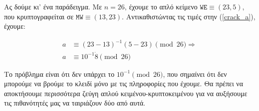 \documentclass{article}
\begin{document}
Ας δούμε κι' ένα παράδειγμα. Με $n = 26$, έχουμε το απλό κείμενο $\texttt{WE} \equiv (23, 5)$, που κρυπτογραφείται σε $\texttt{MW} \equiv (13, 23)$. Αντικαθιστώντας τις τιμές στην (\ref{crack_a}), έχουμε:

\begin{align*}
a &\equiv (23 - 13)^{-1} (5 - 23) \pmod{26} \Rightarrow \\
a &\equiv 10^{-1} \dot 8 \pmod{26}
\end{align*}

Το πρόβλημα είναι ότι δεν υπάρχει το $10^{-1} \pmod{26}$, που σημαίνει ότι δεν μπορούμε να βρούμε το κλειδί μόνο με τις πληροφορίες που έχουμε. Θα πρέπει να αποκτήσουμε περισσότερα ζεύγη απλού κειμένου-κρυπτοκειμένου για να αυξήσουμε τις πιθανότητές μας να ταιριάζουν δύο από αυτά.
\end{document}
